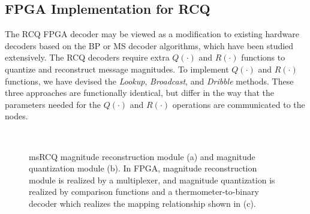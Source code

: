 \documentclass [PhD] {uclathes}
\begin{document}
\subsection{FPGA Implementation for RCQ}
The RCQ FPGA decoder may be viewed as a modification to existing hardware decoders based on the BP or MS decoder algorithms, which have been studied extensively\cite{Zhang_undated-es,Sadek2016-lz,Liu2017-ho,Anantharaman2019-db}. 
The RCQ decoders require extra  $Q(\cdot)$ and $R(\cdot)$ functions to quantize and reconstruct message magnitudes. 
To implement  $Q(\cdot)$ and $R(\cdot)$ functions, we have devised the \emph{Lookup}, \emph{Broadcast}, and \emph{Dribble} methods. 
These three approaches are functionally identical, but differ in the way that the parameters needed for the $Q(\cdot)$ and $R(\cdot)$ operations are communicated to the nodes. 
\begin{figure}[h]
    \centering
  \\
  \caption{msRCQ magnitude reconstruction module (a) and magnitude quantization module (b). In FPGA, magnitude reconstruction module is realized by a multiplexer, and  magnitude quantization is realized by comparison functions and  a thermometer-to-binary decoder which realizes the mapping relationship shown in (c).}
  \label{fig: FPGA}
\end{figure}
\end{document}
